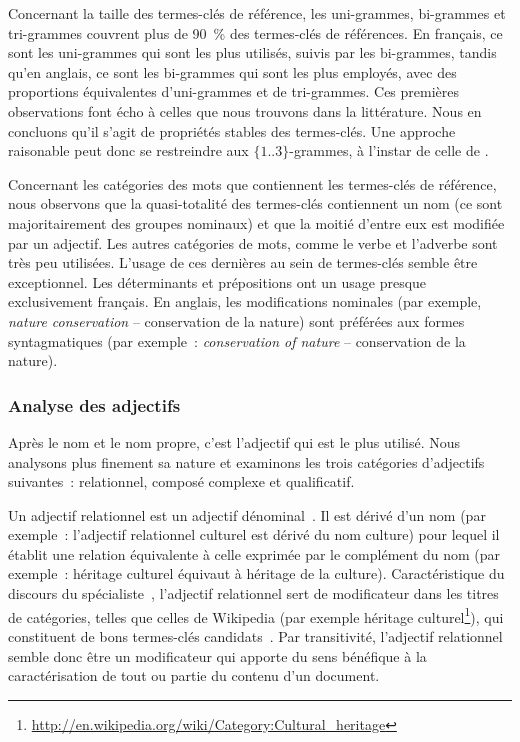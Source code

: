       Concernant la taille des termes-clés de référence, les uni-grammes,
      bi-grammes et tri-grammes couvrent plus de 90~\% des termes-clés de
      références. En français, ce sont les uni-grammes qui sont les plus
      utilisés, suivis par les bi-grammes, tandis qu'en anglais, ce sont les
      bi-grammes qui sont les plus employés, avec des proportions équivalentes
      d'uni-grammes et de tri-grammes. Ces premières observations font écho à
      celles que nous trouvons dans la littérature. Nous en concluons qu'il
      s'agit de propriétés stables des termes-clés. Une approche raisonable peut
      donc se restreindre aux $\{1..3\}$-grammes, à l'instar de celle de
      .

      Concernant les catégories des mots que contiennent les termes-clés de
      référence, nous observons que la quasi-totalité des termes-clés
      contiennent un nom (ce sont majoritairement des groupes nominaux) et
      que la moitié d'entre eux est modifiée par un adjectif. Les autres
      catégories de mots, comme le verbe et l'adverbe sont très peu utilisées.
      L'usage de ces dernières au sein de termes-clés semble être exceptionnel.
      Les déterminants et prépositions ont un usage presque exclusivement
      français. En anglais, les modifications nominales (par exemple,
      \textit{\og{}nature conservation\fg{}} -- \og{}conservation de la
      nature\fg{}) sont préférées aux formes syntagmatiques (par exemple~:
      \textit{\og{}conservation of nature\fg{}} -- \og{}conservation de la
      nature\fg{}).

      \subsubsection{Analyse des adjectifs}
      \label{subsubsec:main:domain_independent_keyphrase_extraction-keyphrase_candidate_selection-analysis_of_keyphrase_properties-adjective_analysis}
      Après le nom et le nom propre, c'est l'adjectif qui est le plus utilisé.
      Nous analysons plus finement sa nature et examinons les trois catégories
      d'adjectifs suivantes~: relationnel, composé complexe et qualificatif.
      
      Un adjectif relationnel est un adjectif
      dénominal~\cite{bally1944linguistiquegeneraleetlinguistiquefrancaise}. Il
      est dérivé d'un nom (par exemple~: l'adjectif relationnel
      \og{}culturel\fg{} est dérivé du nom \og{}culture\fg{}) pour lequel il
      établit une relation équivalente à celle exprimée par le complément du nom
      (par exemple~: \og{}héritage culturel\fg{} équivaut à \og{}héritage de la
      culture\fg{}). Caractéristique du discours du
      spécialiste~\cite{maniez2009denominaladjectives}, l'adjectif relationnel
      sert de modificateur dans les titres de catégories, telles que celles de
      Wikipedia (par exemple \og{}héritage
      culturel\fg{}\footnote{\url{http://en.wikipedia.org/wiki/Category:Cultural_heritage}}),
      qui constituent de bons termes-clés
      candidats~\cite{medelyan2008smalltrainingset,eichler2010keywe}. Par
      transitivité, l'adjectif relationnel semble donc être un modificateur qui
      apporte du sens bénéfique à la caractérisation  de tout ou partie du
      contenu d'un document.
      

